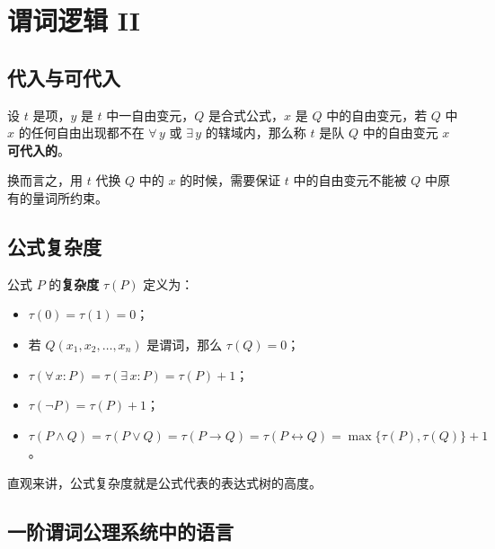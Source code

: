 \section{谓词逻辑 II}

\subsection{代入与可代入}

\begin{definition}[代入]
    
\end{definition}

\begin{definition}[可代入]
    设 $t$ 是项，$y$ 是 $t$ 中一自由变元，$Q$ 是合式公式，$x$ 是 $Q$ 中的自由变元，若 $Q$ 中 $x$ 的任何自由出现都不在 $\forall\,y$ 或 $\exists\,y$ 的辖域内，那么称 $t$ 是队 $Q$ 中的自由变元 $x$ \textbf{可代入的}。
\end{definition}

换而言之，用 $t$ 代换 $Q$ 中的 $x$ 的时候，需要保证 $t$ 中的自由变元不能被 $Q$ 中原有的量词所约束。

\subsection{公式复杂度}

\begin{definition}[公式复杂度]
    公式 $P$ 的\textbf{复杂度} $\tau(P)$ 定义为：
    \begin{itemize}
        \item $\tau(0) = \tau(1) = 0$；
        \item 若 $Q(x_1, x_2, \dots, x_n)$ 是谓词，那么 $\tau(Q) = 0$；
        \item $\tau(\forall\,x: P) = \tau(\exists\,x: P) = \tau(P) + 1$；
        \item $\tau(\lnot P) = \tau(P) + 1$；
        \item $\tau(P \land Q) = \tau(P \lor Q) = \tau(P \to Q) = \tau(P \leftrightarrow Q) = \max\{\tau(P), \tau(Q)\} + 1$。
    \end{itemize}
\end{definition}

直观来讲，公式复杂度就是公式代表的表达式树的高度。

\subsection{一阶谓词公理系统中的语言}

